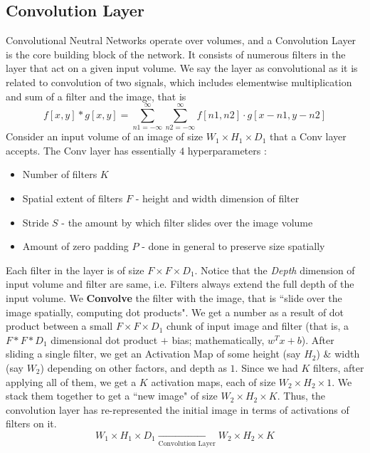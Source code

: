 \documentclass[12pt,a4paper]{article}
\begin{document}
\subsection{Convolution Layer}
Convolutional Neutral Networks operate over volumes, and a Convolution Layer is the core building block of the network. It consists of numerous filters in the layer that act on a given input volume. We say the layer as convolutional as it is related to convolution of two signals, which includes elementwise multiplication and sum of a filter and the image, that is
\begin{equation*}
    f[x,y]*g[x,y] = \sum_{n1 = -\infty}^{\infty}\sum_{n2 = -\infty}^{\infty} f[n1,n2]\cdot g[x-n1,y-n2]
\end{equation*} 
Consider an input volume of an image of size $W_{1} \times H_{1} \times D_{1}$ that a Conv layer accepts. The Conv layer has essentially $4$ hyperparameters :
\begin{itemize}
    \item Number of filters $K$
    \item Spatial extent of filters $F$ - height and width dimension of filter
    \item Stride $S$ - the amount by which filter slides over the image volume
    \item Amount of zero padding $P$ - done in general to preserve size spatially
\end{itemize}
Each filter in the layer is of size $F \times F \times D_{1}$. Notice that the \textit{Depth} dimension of input volume and filter are same, i.e. Filters always extend the full depth of the input volume. We \textbf{Convolve} the filter with the image, that is ``slide over the image spatially, computing dot products". We get a number as a result of dot product between a small $F \times F \times D_{1}$ chunk of input image and filter (that is, a $F*F*D_{1}$ dimensional dot product $+$ bias; mathematically, $w^{T}x + b$). After sliding a single filter, we get an Activation Map of some height (say $H_{2}$) \& width (say $W_{2}$) depending on other factors, and depth as $1$. Since we had $K$ filters, after applying all of them, we get a $K$ activation maps, each of size $W_{2} \times H_{2} \times 1$. We stack them together to get a ``new image" of size $W_{2} \times H_{2} \times K$. Thus, the convolution layer has re-represented the initial image in terms of activations of filters on it.
\begin{equation*}
    W_{1} \times H_{1} \times D_{1} \xrightarrow[\text{Convolution Layer}]{} W_{2} \times H_{2} \times K
\end{equation*}
\end{document}
